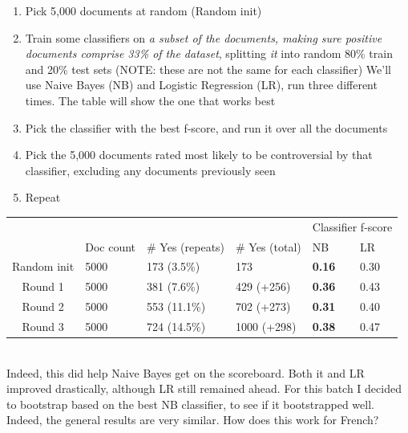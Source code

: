 \documentclass[11pt]{article} %
\begin{document}
\begin{enumerate}
\item Pick 5,000 documents at random (Random init)
\item Train some classifiers on \emph{a subset of the documents, making sure positive documents comprise 33\% of the dataset}, splitting \emph{it}	 into random 80\% train and 20\% test sets (NOTE: these are not the same for each classifier)
We'll use Naive Bayes (NB) and Logistic Regression (LR), run three different times. The table will show the one that works best
\item Pick the classifier with the best f-score, and run it over all the documents
\item Pick the 5,000 documents rated most likely to be controversial by that classifier, excluding any documents previously seen
\item Repeat
\end{enumerate}
\begin{tabular}{|c|l|l|l|l|l|}
\rowcolor{gray!50} &&&& \multicolumn{2}{|c|}{Classifier f-score} \\
\rowcolor{gray!50} & Doc count & \# Yes (repeats) & \# Yes (total) & NB & LR \\
Random init & 5000 & 173 (3.5\%) & 173 & \textbf{0.16} & 0.30 \\
Round 1 & 5000 & 381 (7.6\%) & 429 (+256) & \textbf{0.36} & 0.43 \\
Round 2 & 5000 & 553 (11.1\%) & 702 (+273) & \textbf{0.31} & 0.40 \\
Round 3 & 5000 & 724 (14.5\%) & 1000 (+298) & \textbf{0.38}  & 0.47
\end{tabular}
\\
Indeed, this did help Naive Bayes get on the scoreboard. Both it and LR improved drastically, although LR still remained ahead. For this batch I decided to bootstrap based on the best NB classifier, to see if it bootstrapped well. Indeed, the general results are very similar. How does this work for French?
\end{document}
